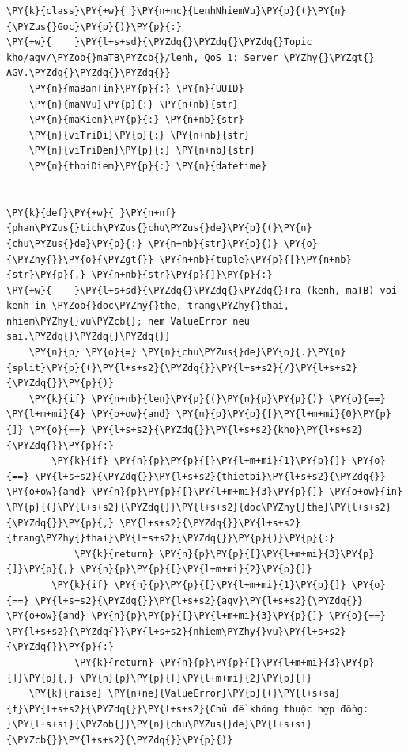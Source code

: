 \begin{Verbatim}[commandchars=\\\{\},frame=single,framerule=0.3pt,rulecolor=\color{black!40},fontsize=\footnotesize,breaklines=true]
\PY{k}{class}\PY{+w}{ }\PY{n+nc}{LenhNhiemVu}\PY{p}{(}\PY{n}{\PYZus{}Goc}\PY{p}{)}\PY{p}{:}
\PY{+w}{    }\PY{l+s+sd}{\PYZdq{}\PYZdq{}\PYZdq{}Topic kho/agv/\PYZob{}maTB\PYZcb{}/lenh, QoS 1: Server \PYZhy{}\PYZgt{} AGV.\PYZdq{}\PYZdq{}\PYZdq{}}
    \PY{n}{maBanTin}\PY{p}{:} \PY{n}{UUID}
    \PY{n}{maNVu}\PY{p}{:} \PY{n+nb}{str}
    \PY{n}{maKien}\PY{p}{:} \PY{n+nb}{str}
    \PY{n}{viTriDi}\PY{p}{:} \PY{n+nb}{str}
    \PY{n}{viTriDen}\PY{p}{:} \PY{n+nb}{str}
    \PY{n}{thoiDiem}\PY{p}{:} \PY{n}{datetime}


\PY{k}{def}\PY{+w}{ }\PY{n+nf}{phan\PYZus{}tich\PYZus{}chu\PYZus{}de}\PY{p}{(}\PY{n}{chu\PYZus{}de}\PY{p}{:} \PY{n+nb}{str}\PY{p}{)} \PY{o}{\PYZhy{}}\PY{o}{\PYZgt{}} \PY{n+nb}{tuple}\PY{p}{[}\PY{n+nb}{str}\PY{p}{,} \PY{n+nb}{str}\PY{p}{]}\PY{p}{:}
\PY{+w}{    }\PY{l+s+sd}{\PYZdq{}\PYZdq{}\PYZdq{}Tra (kenh, maTB) voi kenh in \PYZob{}doc\PYZhy{}the, trang\PYZhy{}thai, nhiem\PYZhy{}vu\PYZcb{}; nem ValueError neu sai.\PYZdq{}\PYZdq{}\PYZdq{}}
    \PY{n}{p} \PY{o}{=} \PY{n}{chu\PYZus{}de}\PY{o}{.}\PY{n}{split}\PY{p}{(}\PY{l+s+s2}{\PYZdq{}}\PY{l+s+s2}{/}\PY{l+s+s2}{\PYZdq{}}\PY{p}{)}
    \PY{k}{if} \PY{n+nb}{len}\PY{p}{(}\PY{n}{p}\PY{p}{)} \PY{o}{==} \PY{l+m+mi}{4} \PY{o+ow}{and} \PY{n}{p}\PY{p}{[}\PY{l+m+mi}{0}\PY{p}{]} \PY{o}{==} \PY{l+s+s2}{\PYZdq{}}\PY{l+s+s2}{kho}\PY{l+s+s2}{\PYZdq{}}\PY{p}{:}
        \PY{k}{if} \PY{n}{p}\PY{p}{[}\PY{l+m+mi}{1}\PY{p}{]} \PY{o}{==} \PY{l+s+s2}{\PYZdq{}}\PY{l+s+s2}{thietbi}\PY{l+s+s2}{\PYZdq{}} \PY{o+ow}{and} \PY{n}{p}\PY{p}{[}\PY{l+m+mi}{3}\PY{p}{]} \PY{o+ow}{in} \PY{p}{(}\PY{l+s+s2}{\PYZdq{}}\PY{l+s+s2}{doc\PYZhy{}the}\PY{l+s+s2}{\PYZdq{}}\PY{p}{,} \PY{l+s+s2}{\PYZdq{}}\PY{l+s+s2}{trang\PYZhy{}thai}\PY{l+s+s2}{\PYZdq{}}\PY{p}{)}\PY{p}{:}
            \PY{k}{return} \PY{n}{p}\PY{p}{[}\PY{l+m+mi}{3}\PY{p}{]}\PY{p}{,} \PY{n}{p}\PY{p}{[}\PY{l+m+mi}{2}\PY{p}{]}
        \PY{k}{if} \PY{n}{p}\PY{p}{[}\PY{l+m+mi}{1}\PY{p}{]} \PY{o}{==} \PY{l+s+s2}{\PYZdq{}}\PY{l+s+s2}{agv}\PY{l+s+s2}{\PYZdq{}} \PY{o+ow}{and} \PY{n}{p}\PY{p}{[}\PY{l+m+mi}{3}\PY{p}{]} \PY{o}{==} \PY{l+s+s2}{\PYZdq{}}\PY{l+s+s2}{nhiem\PYZhy{}vu}\PY{l+s+s2}{\PYZdq{}}\PY{p}{:}
            \PY{k}{return} \PY{n}{p}\PY{p}{[}\PY{l+m+mi}{3}\PY{p}{]}\PY{p}{,} \PY{n}{p}\PY{p}{[}\PY{l+m+mi}{2}\PY{p}{]}
    \PY{k}{raise} \PY{n+ne}{ValueError}\PY{p}{(}\PY{l+s+sa}{f}\PY{l+s+s2}{\PYZdq{}}\PY{l+s+s2}{Chủ đề không thuộc hợp đồng: }\PY{l+s+si}{\PYZob{}}\PY{n}{chu\PYZus{}de}\PY{l+s+si}{\PYZcb{}}\PY{l+s+s2}{\PYZdq{}}\PY{p}{)}



\end{Verbatim}
